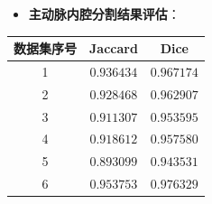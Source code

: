 \begin{frame}
\begin{itemize}
  \item \textbf{主动脉内腔分割结果评估}：
\end{itemize}
\begin{table}[t]
\renewcommand{\arraystretch}{0.5}
\centering
\begin{tabular*}{75mm}{c c c}
\toprule
\hspace{2mm} \small{数据集序号}  & \hspace{2mm} \small{Jaccard}    & \hspace{2mm} \small{Dice}       \\
\midrule
\hspace{2mm} \small{1}           & \hspace{2mm} \small{$0.936434$} & \hspace{2mm} \small{$0.967174$} \\
\midrule
\hspace{2mm} \small{2}           & \hspace{2mm} \small{$0.928468$} & \hspace{2mm} \small{$0.962907$} \\
\midrule
\hspace{2mm} \small{3}           & \hspace{2mm} \small{$0.911307$} & \hspace{2mm} \small{$0.953595$} \\
\midrule
\hspace{2mm} \small{4}           & \hspace{2mm} \small{$0.918612$} & \hspace{2mm} \small{$0.957580$} \\
\midrule
\hspace{2mm} \small{5}           & \hspace{2mm} \small{$0.893099$} & \hspace{2mm} \small{$0.943531$} \\
\midrule
\hspace{2mm} \small{6}           & \hspace{2mm} \small{$0.953753$} & \hspace{2mm} \small{$0.976329$} \\

\end{tabular*}
\end{table}
\end{frame}
